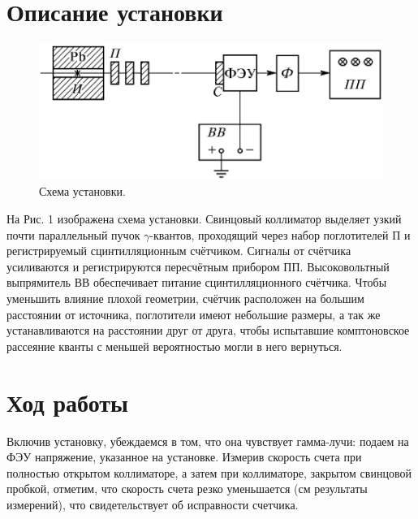 \documentclass[a4paper,12pt]{article}
\begin{document}
\section*{Описание установки}
\begin{figure}[h]
\includegraphics[scale=0.5]{1.png}
\centering
\caption{Схема установки.}
\end{figure}
На Рис. 1 изображена схема установки. Свинцовый коллиматор выделяет узкий почти параллельный пучок $\gamma$-квантов, проходящий через набор поглотителей П и регистрируемый сцинтилляционным счётчиком. Сигналы от счётчика усиливаются и регистрируются пересчётным прибором ПП. Высоковольтный выпрямитель ВВ обеспечивает питание сцинтилляционного счётчика. Чтобы уменьшить влияние плохой геометрии, счётчик расположен на большим расстоянии от источника, поглотители имеют небольшие размеры, а так же устанавливаются на расстоянии друг от друга, чтобы испытавшие комптоновское рассеяние кванты с меньшей вероятностью могли в него вернуться.
\section*{Ход работы}
Включив установку, убеждаемся в том, что она чувствует гамма-лучи: подаем на ФЭУ напряжение, указанное на установке. Измерив скорость счета при полностью открытом коллиматоре, а затем при коллиматоре, закрытом свинцовой пробкой, отметим, что скорость счета резко уменьшается (см результаты измерений), что
свидетельствует об исправности счетчика. 
\end{document}
